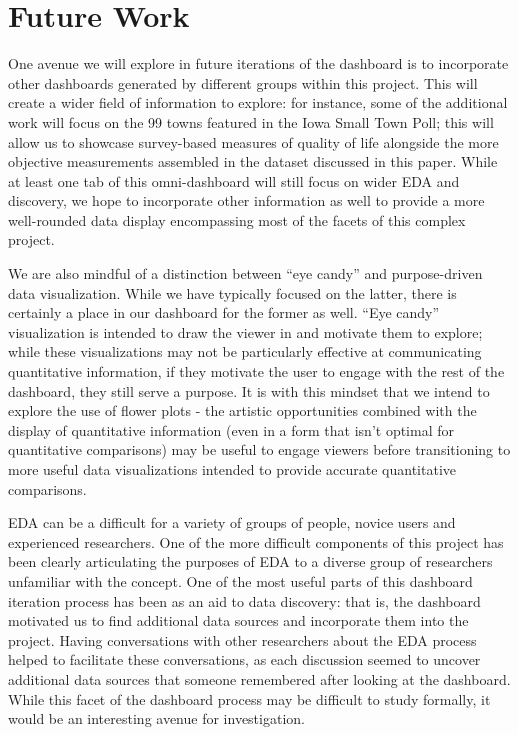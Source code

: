 \documentclass[print]{nuthesis}
\begin{document}
\hypertarget{future-work}{%
\section{Future Work}\label{future-work}}

One avenue we will explore in future iterations of the dashboard is to incorporate other dashboards generated by different groups within this project. This will create a wider field of information to explore: for instance, some of the additional work will focus on the 99 towns featured in the Iowa Small Town Poll; this will allow us to showcase survey-based measures of quality of life alongside the more objective measurements assembled in the dataset discussed in this paper. While at least one tab of this omni-dashboard will still focus on wider EDA and discovery, we hope to incorporate other information as well to provide a more well-rounded data display encompassing most of the facets of this complex project.

We are also mindful of a distinction between ``eye candy'' and purpose-driven data visualization. While we have typically focused on the latter, there is certainly a place in our dashboard for the former as well. ``Eye candy'' visualization is intended to draw the viewer in and motivate them to explore; while these visualizations may not be particularly effective at communicating quantitative information, if they motivate the user to engage with the rest of the dashboard, they still serve a purpose. It is with this mindset that we intend to explore the use of flower plots - the artistic opportunities combined with the display of quantitative information (even in a form that isn't optimal for quantitative comparisons) may be useful to engage viewers before transitioning to more useful data visualizations intended to provide accurate quantitative comparisons.

EDA can be a difficult for a variety of groups of people, novice users and experienced researchers. One of the more difficult components of this project has been clearly articulating the purposes of EDA to a diverse group of researchers unfamiliar with the concept. One of the most useful parts of this dashboard iteration process has been as an aid to data discovery: that is, the dashboard motivated us to find additional data sources and incorporate them into the project. Having conversations with other researchers about the EDA process helped to facilitate these conversations, as each discussion seemed to uncover additional data sources that someone remembered after looking at the dashboard. While this facet of the dashboard process may be difficult to study formally, it would be an interesting avenue for investigation.
\end{document}
